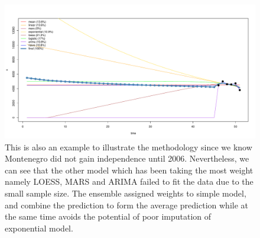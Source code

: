\documentclass[nojss]{jss}\usepackage[]{graphicx}\usepackage[]{color}
\makeatletter
\def\maxwidth{ %
  \ifdim\Gin@nat@width>\linewidth
    \linewidth
  \else
    \Gin@nat@width
  \fi
}
\newenvironment{knitrout}{}{} %
\makeatother
\begin{document}
\begin{knitrout}
\color{fgcolor}\begin{figure}[!ht]


{\centering \includegraphics[width=\maxwidth]{figure/beef-montenegro} 

}

\caption[This is also an example to illustrate the methodology since we know Montenegro did not gain independence until 2006]{This is also an example to illustrate the methodology since we know Montenegro did not gain independence until 2006. Nevertheless, we can see that the other model which has been taking the most weight namely LOESS, MARS and ARIMA failed to fit the data due to the small sample size. The ensemble assigned weights to simple model, and combine the prediction to form the average prediction while at the same time avoids the potential of poor imputation of exponential model.\label{fig:beef-montenegro}}
\end{figure}


\end{knitrout}
\end{document}
